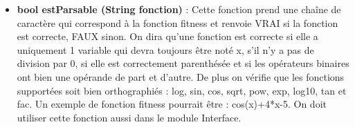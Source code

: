 \documentclass[a4paper,11pt]{article}
\begin{document}
\begin{itemize}
				\item \textbf{bool estParsable (String fonction)} : Cette fonction prend une chaîne de caractère qui correspond à la fonction fitness et renvoie VRAI si la fonction est correcte, FAUX sinon. On dira qu’une fonction est correcte si elle a uniquement 1 variable qui devra toujours être noté x, s’il n’y a pas de division par 0, si elle est correctement parenthésée et si les opérateurs binaires ont bien une opérande de part et d’autre. De plus on vérifie que les fonctions supportées soit bien orthographiés : log, sin, cos, sqrt, pow, exp, log10, tan et fac.  Un exemple de fonction fitness pourrait être : cos(x)+4*x-5. On doit utiliser cette fonction aussi dans le module Interface.\\
			\end{itemize}
			
\end{document}
